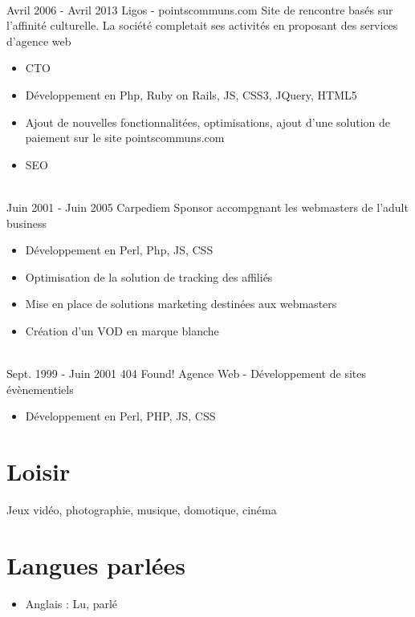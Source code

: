 \documentclass[letterpaper]{twentysecondcv} %
\begin{document}
\begin{twenty}
    
     \\   
    \twentyitem
   		{Avril 2006 - }
		{Avril 2013}
        {Ligos - pointscommuns.com}
        {}
        {Site de rencontre basés sur l'affinité culturelle. La société completait ses activités en proposant des services d'agence web}
        {
        {\begin{itemize}
        \item CTO
        \item Développement en Php, Ruby on Rails, JS, CSS3, JQuery, HTML5
        \item Ajout de nouvelles fonctionnalitées, optimisations, ajout d'une solution de paiement sur le site \mbox{pointscommuns.com}
        \item SEO


    \end{itemize}}
        }
        
\end{twenty}

\begin{twenty}        
    
     \\   
    \twentyitem
   		{Juin 2001 - }
		{Juin 2005}
        {Carpediem}
        {}
        {Sponsor accompgnant les webmasters de l'adult business}
        {
        {\begin{itemize}
        \item Développement en Perl, Php, JS, CSS
        \item Optimisation de la solution de tracking des affiliés
        \item Mise en place de solutions marketing destinées aux webmasters
        \item Création d'un VOD en marque blanche

    \end{itemize}}
        }

\end{twenty}

\begin{twenty}
       
    \\   
    \twentyitem
   		{Sept. 1999 - }
		{Juin 2001}
        {404 Found!}
        {}
        {Agence Web - Développement de sites évènementiels}
        {
        {\begin{itemize}
        \item Développement en Perl, PHP, JS, CSS
        \end{itemize}}
        }
        
\end{twenty}



\section{Loisir}
Jeux vidéo, photographie, musique, domotique, cinéma

\section{Langues parlées}
\begin{itemize}
\item Anglais : Lu, parlé
\end{itemize}
\end{document}
